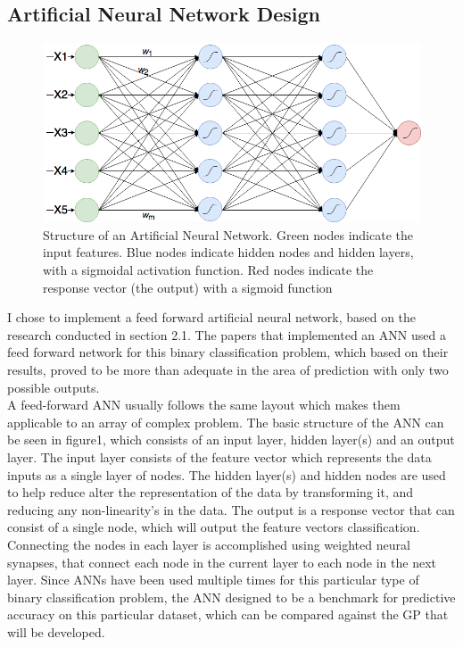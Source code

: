 \documentclass[11pt]{article}
\begin{document}
\subsection{Artificial Neural Network Design}
\begin{figure}[h]
\centering
\captionsetup{justification=centering}
\includegraphics[scale = .37]{ANN}
\caption{Structure of an Artificial Neural Network. Green nodes indicate the input features. Blue nodes indicate hidden nodes and hidden layers, with a sigmoidal activation function. Red nodes indicate the response vector (the output) with a sigmoid function } 
\end{figure}
I chose to implement a feed forward artificial neural network, based on the research conducted in section 2.1. The papers that implemented an ANN used a feed forward network for this binary classification problem, which based on their results, proved to be more than adequate in the area of prediction with only two possible outputs.\\
A feed-forward ANN usually follows the same layout which makes them applicable to an array of complex problem. The basic structure of the ANN can be seen in figure1, which consists of an input layer, hidden layer(s) and an output layer. The input layer consists of the feature vector which represents the data inputs as a single layer of nodes. The hidden layer(s) and hidden nodes are used to help reduce alter the representation of the data by transforming it, and reducing any non-linearity's in the data. The output is a response vector that can consist of a single node, which will output the feature vectors classification. Connecting the nodes in each layer is accomplished using weighted neural synapses, that connect each node in the current layer to each node in the next layer. Since ANNs have been used multiple times for this particular type of binary classification problem, the ANN designed to be a benchmark for predictive accuracy on this particular dataset, which can be compared against the GP that will be developed. 
\end{document}
